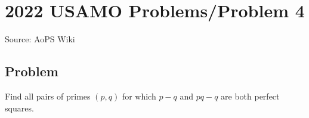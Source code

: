 \documentclass[12pt]{article}
\begin{document}
\section*{{2022 USAMO Problems/Problem 4}}
Source: AoPS Wiki

\subsection*{Problem}
Find all pairs of primes $(p, q)$ for which $p-q$ and $pq-q$ are both perfect squares.
\end{document}
